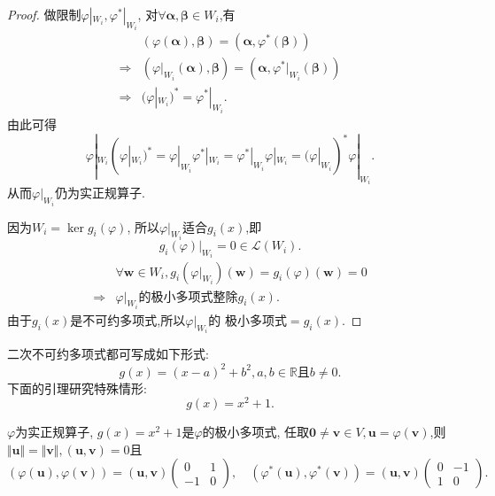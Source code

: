 \begin{proof}
  做限制$\varphi|_{W_i}, \varphi^*|_{W_i}$,
  对$\forall \bm{\alpha}, \bm{\beta}\in W_i$,有
  \begin{align*}
    & (\varphi(\bm{\alpha}), \bm{\beta})=(\bm{\alpha},\varphi^*(\bm{\beta}))\\
    \Longrightarrow & (\varphi|_{W_i}(\bm{\alpha}),\bm{\beta})=(\bm{\alpha},\varphi^*|_{W_i}(\bm{\beta}))\\
    \Longrightarrow & (\varphi|_{W_i})^*=\varphi^*|_{W_i}.
  \end{align*}
  由此可得
  \[
    \varphi|_{W_i}(\varphi|_{W_i})^*=\varphi|_{W_i}\varphi^*|_{W_i}=
    \varphi^*|_{W_i}\varphi|_{W_i}=(\varphi|_{W_i})^*\varphi|_{W_i}.
  \]
  从而$\varphi|_{W_i}$仍为实正规算子.

  因为$W_i=\ker g_i(\varphi)$,
  所以$\varphi|_{W_i}$适合$g_i(x)$,即
  \[
    g_i(\varphi)|_{W_i}=0 \in \mathscr{L}(W_i).
  \]
  \begin{align*}
    &\forall \bm{w}\in W_i, g_i(\varphi|_{W_i})(\bm{w})=g_i(\varphi)(\bm{w})=0\\
    \Longrightarrow & \varphi|_{W_i}\text{的极小多项式整除}g_i(x).
  \end{align*}
  由于$g_i(x)$是不可约多项式,所以$\varphi|_{W_i}$的
  极小多项式$=g_i(x)$.
\end{proof}

\begin{remark}
  二次不可约多项式都可写成如下形式:
  \[
    g(x)=(x-a)^2+b^2, a,b\in\mathbb{R}\text{且}b\neq 0.
  \]
  下面的引理研究特殊情形:
  \[
    g(x)=x^2+1.
  \]
\end{remark}

\begin{theory}\label{thr:Real-normal-matrix3}
  $\varphi$为实正规算子, $g(x)=x^2+1$是$\varphi$的极小多项式,
  任取$\bm{0}\neq \bm{v} \in V, \bm{u}=\varphi(\bm{v})$,则
  $\Vert\bm{u}\Vert=\Vert\bm{v}\Vert, (\bm{u},\bm{v})=0$且
  \[
    (\varphi(\bm{u}),\varphi(\bm{v}))=(\bm{u},\bm{v})\begin{pmatrix}
      0 & 1\\
      -1 & 0
    \end{pmatrix},\quad
    (\varphi^*(\bm{u}),\varphi^*(\bm{v}))=(\bm{u},\bm{v})\begin{pmatrix}
      0 & -1\\
      1 & 0
    \end{pmatrix}.
  \]
\end{theory}

